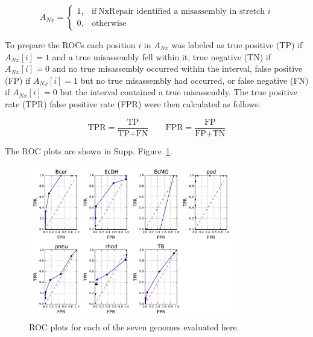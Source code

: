 \documentclass[12pt]{article}
\begin{document}

\begin{equation}
    A_{Nx}=
    \begin{cases}
      1, & \text{if}\ \text{NxRepair identified a misassembly in stretch $i$} \\
      0, & \text{otherwise}
    \end{cases}
  \label{eq:found}
\end{equation}

To prepare the ROCs each position $i$ in $A_{Nx}$ was labeled as true positive (TP) if $A_{Nx}[i] = 1$ and a true misassembly fell within it, true negative (TN) if $A_{Nx}[i] = 0$ and no true misassembly occurred within the interval, false positive (FP) if $A_{Nx}[i] = 1$ but no true misassembly had occurred, or false negative (FN) if $A_{Nx}[i] = 0$ but the interval contained a true misassembly. The true positive rate (TPR) false positive rate (FPR) were then calculated as follows:

\begin{equation}
\text{TPR} = \frac{\text{TP}}{\text{TP} + \text{FN}} \qquad \text{FPR} = \frac{\text{FP}}{\text{FP} + \text{TN}}
\label{eq:tpr}
\end{equation} 

The ROC plots are shown in Supp. Figure~\ref{fig:ROCs}.

\begin{figure}
\centerline{\includegraphics[width=0.8\textwidth]{allROC_extensive.pdf}}
\caption{ROC plots for each of the seven genomes evaluated here.\label{fig:ROCs}}
\end{figure}
\end{document}
